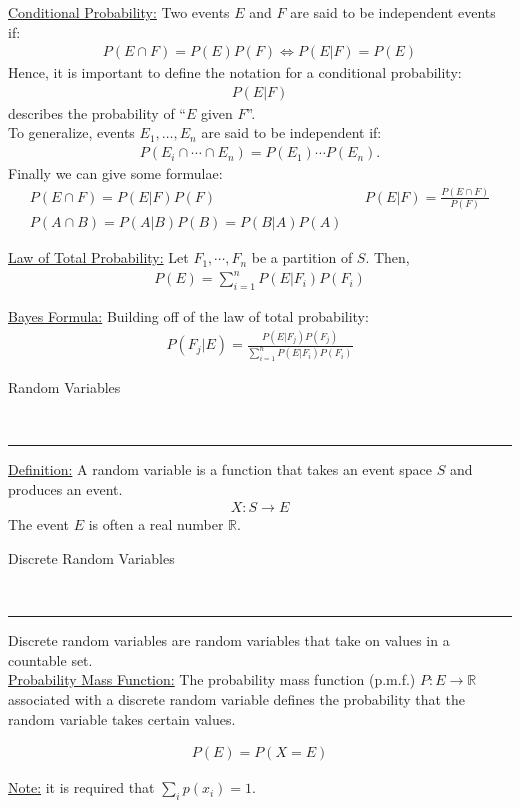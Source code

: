 \documentclass{article}
\newcommand{\header}[1]{\begin{large}\noindent #1\end{large}\\\rule{\textwidth}{0.5pt}}
\newcommand{\sheader}[1]{\underline{#1:}}
\newcommand{\gap}{\medskip\\}
\newcommand{\sgap}{\smallskip\\}
\begin{document}
\sheader{Conditional Probability}
Two events $E$ and $F$ are said to be independent events if:
\begin{align*}
    P(E \cap F) = P(E)P(F) \iff P(E|F) = P(E)
\end{align*}
Hence, it is important to define the notation for a conditional probability:
\begin{align*}
    P(E|F)
\end{align*}
describes the probability of ``$E$ given $F$''.
\sgap
To generalize, events $E_1, \ldots, E_n$ are said to be independent if:
\begin{align*}
    P(E_i \cap \cdots \cap E_n) = P(E_1) \cdots P(E_n).
\end{align*}
Finally we can give some formulae:
\begin{align*}
    P(E \cap F) = P(E|F)P(F) && P(E|F) = \frac{P(E \cap F)}{P(F)}\\
    P(A \cap B) = P(A|B)P(B) = P(B|A)P(A)
\end{align*}

\sheader{Law of Total Probability} Let $F_1, \cdots, F_n$ be a partition of $S$. Then,
\begin{align*}
    P(E) = \sum_{i = 1}^{n} P(E|F_i)P(F_i)
\end{align*}

\sheader{Bayes Formula} Building off of the law of total probability:
\begin{align*}
    P(F_j|E) = \frac{P(E|F_j)P(F_j)}{\sum_{i=1}^{n}P(E|F_i)P(F_i)}
\end{align*}

\header{Random Variables}

\sheader{Definition} A random variable is a function that takes an event space $S$
and produces an event.
\begin{align*}
    X: S \to E
\end{align*}
The event $E$ is often a real number $\mathbb{R}$.
\gap
\header{Discrete Random Variables} Discrete random variables are random variables that take on values in a countable set.
\gap
\sheader{Probability Mass Function} The probability mass function (p.m.f.) $P: E \to \mathbb{R}$ associated with a discrete 
random variable defines the probability that the random variable takes certain values.

\begin{align*}
    P(E) = P(X=E)
\end{align*}

\sheader{Note} it is required that $\sum_i p(x_i) = 1$.
\gap
\end{document}

